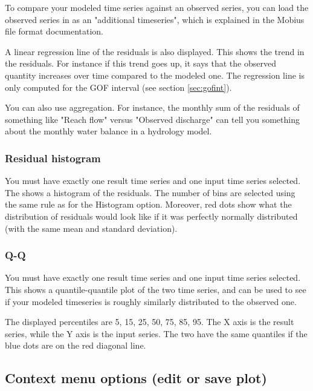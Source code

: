 \documentclass[11pt]{article}
\theoremstyle{definition}
\begin{document}
To compare your modeled time series against an observed series, you can load the observed series in as an "additional timeseries", which is explained in the Mobius file format documentation.

A linear regression line of the residuals is also displayed. This shows the trend in the residuals. For instance if this trend goes up, it says that the observed quantity increases over time compared to the modeled one. The regression line is only computed for the GOF interval (see section \ref{sec:gofint}).

You can also use aggregation. For instance, the monthly sum of the residuals of something like "Reach flow" versus "Observed discharge" can tell you something about the monthly water balance in a hydrology model.

\subsubsection{Residual histogram}

You must have exactly one result time series and one input time series selected. The shows a histogram of the residuals. The number of bins are selected using the same rule as for the Histogram option. Moreover, red dots show what the distribution of residuals would look like if it was perfectly normally distributed (with the same mean and standard deviation).

\subsubsection{Q-Q}

You must have exactly one result time series and one input time series selected. This shows a quantile-quantile plot of the two time series, and can be used to see if your modeled timeseries is roughly similarly distributed to the observed one.

The displayed percentiles are 5, 15, 25, 50, 75, 85, 95. The X axis is the result series, while the Y axis is the input series. The two have the same quantiles if the blue dots are on the red diagonal line.

\subsection{Context menu options (edit or save plot)}
\end{document}
